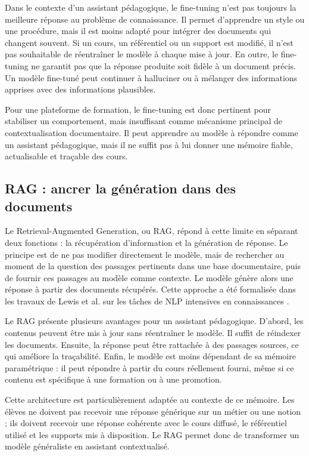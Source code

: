 \documentclass[12pt,a4paper]{article}
\begin{document}
Dans le contexte d'un assistant pédagogique, le fine-tuning n'est pas toujours la meilleure
réponse au problème de connaissance. Il permet d'apprendre un style ou une procédure,
mais il est moins adapté pour intégrer des documents qui changent souvent. Si un cours,
un référentiel ou un support est modifié, il n'est pas souhaitable de réentraîner le modèle
à chaque mise à jour. En outre, le fine-tuning ne garantit pas que la réponse produite soit
fidèle à un document précis. Un modèle fine-tuné peut continuer à halluciner ou à
mélanger des informations apprises avec des informations plausibles.

Pour une plateforme de formation, le fine-tuning est donc pertinent pour stabiliser un
comportement, mais insuffisant comme mécanisme principal de contextualisation
documentaire. Il peut apprendre au modèle à répondre comme un assistant pédagogique,
mais il ne suffit pas à lui donner une mémoire fiable, actualisable et traçable des cours.

\subsection{RAG : ancrer la génération dans des documents}

Le Retrieval-Augmented Generation, ou RAG, répond à cette limite en séparant deux
fonctions : la récupération d'information et la génération de réponse. Le principe est de
ne pas modifier directement le modèle, mais de rechercher au moment de la question des
passages pertinents dans une base documentaire, puis de fournir ces passages au modèle
comme contexte. Le modèle génère alors une réponse à partir des documents récupérés.
Cette approche a été formalisée dans les travaux de Lewis et al. sur les tâches de NLP
intensives en connaissances \cite{lewis2020retrieval}.

Le RAG présente plusieurs avantages pour un assistant pédagogique. D'abord, les contenus
peuvent être mis à jour sans réentraîner le modèle. Il suffit de réindexer les documents.
Ensuite, la réponse peut être rattachée à des passages sources, ce qui améliore la
traçabilité. Enfin, le modèle est moins dépendant de sa mémoire paramétrique : il peut
répondre à partir du cours réellement fourni, même si ce contenu est spécifique à une
formation ou à une promotion.

Cette architecture est particulièrement adaptée au contexte de ce mémoire. Les élèves ne
doivent pas recevoir une réponse générique sur un métier ou une notion ; ils doivent
recevoir une réponse cohérente avec le cours diffusé, le référentiel utilisé et les supports
mis à disposition. Le RAG permet donc de transformer un modèle généraliste en assistant
contextualisé.
\end{document}
